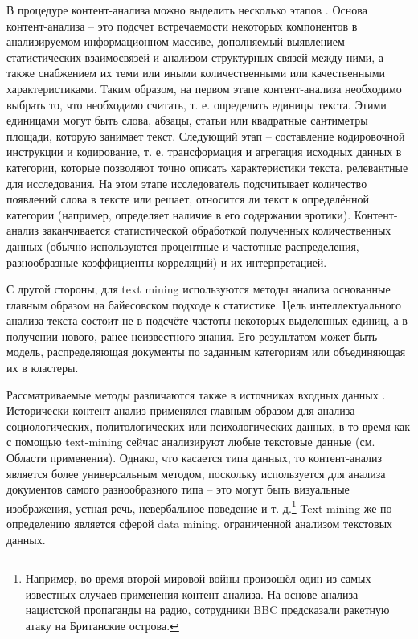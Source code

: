В процедуре контент-анализа можно выделить несколько этапов \cite[стр. 12-13]{Morozova2007}. Основа контент-анализа – это подсчет встречаемости некоторых компонентов в анализируемом информационном массиве, дополняемый выявлением статистических взаимосвязей и анализом структурных связей между ними, а также снабжением их теми или иными количественными или качественными характеристиками. Таким образом, на первом этапе контент-анализа необходимо выбрать то, что необходимо считать, т. е. определить единицы текста. Этими единицами могут быть слова, абзацы, статьи или квадратные сантиметры площади, которую занимает текст. Следующий этап -- составление кодировочной инструкции и кодирование, т. е. трансформация и агрегация исходных данных в категории, которые позволяют точно описать характеристики текста, релевантные для исследования. На этом этапе исследователь подсчитывает количество появлений слова в тексте или решает, относится ли текст к определённой категории (например, определяет наличие в его содержании эротики). Контент-анализ заканчивается статистической обработкой полученных количественных данных (обычно используются процентные и частотные распределения, разнообразные коэффициенты корреляций) и их интерпретацией.

С другой стороны, для text mining используются методы анализа основанные главным образом на байесовском подходе к статистике. Цель интеллектуального анализа текста состоит не в подсчёте частоты некоторых выделенных единиц, а в получении нового, ранее неизвестного знания. Его результатом может быть модель, распределяющая документы по заданным категориям или объединяющая их в кластеры.

Рассматриваемые методы различаются также в источниках входных данных \cite[стр. 735]{tm_and_ca}. Исторически контент-анализ применялся главным образом для анализа социологических, политологических или психологических данных, в то время как с помощью text-mining сейчас анализируют любые текстовые данные (см. Области применения). Однако, что касается типа данных, то контент-анализ является более универсальным методом, поскольку используется для анализа документов самого разнообразного типа -- это могут быть визуальные изображения, устная речь, невербальное поведение и т. д.\footnote{Например, во время второй мировой войны произошёл один из самых известных случаев применения контент-анализа. На основе анализа нацистской пропаганды на радио, сотрудники BBC предсказали ракетную атаку на Британские острова.} Text mining же по определению является сферой data mining, ограниченной анализом текстовых данных.

